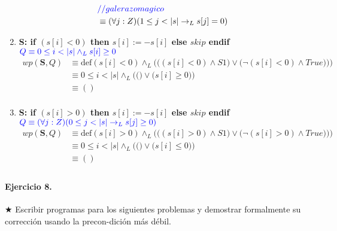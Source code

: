 \documentclass{article}
\begin{document}
\begin{enumerate}[label=\alph*)]
\begin{align*}
   							&\color{blue}//galerazo magico\\
   							& \equiv (\forall j :Z)(1 \leq j < |s| \rightarrow_L s[j] = 0)   							 
   		\end{align*}
	\item
		\textbf{S: if $(s[i]<0)$ then $s[i] := -s[i]$ else $skip$ endif}\\
   		\hspace*{24mm}$\color{blue}Q \equiv 0 \leq i < |s| \wedge_L s[i] \geq 0$\\
   		\begin{align*}
   			wp(\textbf{S},Q)&\equiv \textrm{def}(s[i]<0)\wedge_L 
   				\Bigg(\Big((s[i]<0)\wedge S1\Big) \vee\Big(\neg (s[i]<0)\wedge True)\Big)\Bigg)\\
   							&\equiv 0\leq i<|s|\wedge_L\Bigg(\Big(\Big) \vee \Big(s[i]\geq 0
   							\Big)\Bigg)\\
   							&\equiv () \\
   		\end{align*}
   	\item
   		\textbf{S: if $(s[i]>0)$ then $s[i]:= -s[i] $ else $skip$ endif}\\
   		\hspace*{24mm}$\color{blue}Q \equiv (\forall j :Z)(0 \leq j < |s| 
   			\rightarrow_L s[j] \geq 0)$\\
   		\begin{align*}
   			wp(\textbf{S},Q)&\equiv \textrm{def}(s[i]>0)\wedge_L 
   				\Bigg(\Big((s[i]>0)\wedge S1\Big) \vee\Big(\neg (s[i]>0)\wedge True)\Big)\Bigg)\\
   							&\equiv 0\leq i<|s|\wedge_L\Bigg(\Big(\Big) \vee \Big(s[i]\leq 0
   							\Big)\Bigg)\\
   							&\equiv () \\
   		\end{align*}	
\end{enumerate}
                                                          
\paragraph{Ejercicio 8.} $\bigstar$ Escribir programas para los siguientes problemas y demostrar 
formalmente su corrección usando la precon-dición más débil.
\end{document}
